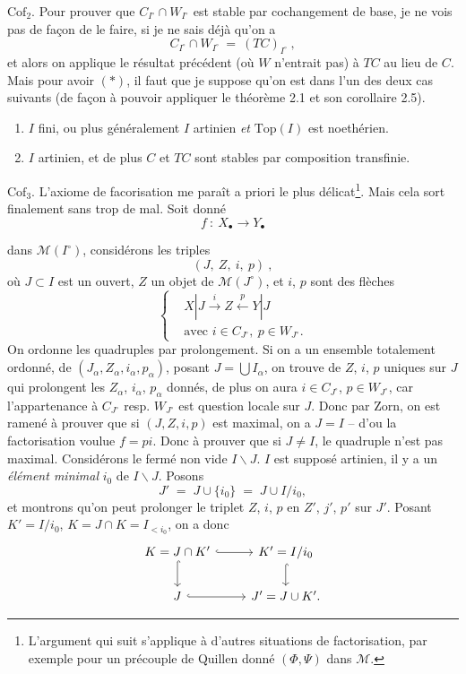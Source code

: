 \documentclass[11pt]{article}
\newcommand{\printedpage}[1]{\marginpar{\footnotesize p.~#1\ifstrequal{#1}{1}{\\[2pt]{[page 1]}}{}}}
\newcommand{\msp}[1]{\ifstrequal{#1}{page 1}{}{\marginpar{\footnotesize [#1]}}}
\newcommand{\M}{\mathcal{M}}
\begin{document}
$\mathrm{Cof}_2$. Pour prouver que $C_{I^\circ} \cap W_{I^\circ}$ est stable par cochangement de base, je ne vois pas de façon de le faire, si je ne sais déjà qu'on a
\[ C_{I^\circ} \cap W_{I^\circ} \ = \ (TC)_{I^\circ}\ , \tag*{$(*)$} \]
et alors on applique le résultat précédent (où $W$ n'entrait pas) à $TC$ au lieu de $C$. Mais pour avoir $(*)$, il faut que je suppose qu'on est dans l'un des deux cas suivants (de façon à pouvoir appliquer le théorème 2.1 et son corollaire 2.5).
\begin{enumerate}[leftmargin=2.5em]
\item[a)] $I$ fini, ou plus généralement $I$ artinien \textit{et} $\mathrm{Top}(I)$ est noethérien.
\item[b)] $I$ artinien, et de plus $C$ et $TC$ sont stables par composition transfinie.
\end{enumerate}
$\mathrm{Cof}_3$. L'axiome de facorisation me paraît a priori le plus délicat\footnote[15]{L'argument qui suit s'applique à d'autres situations de factorisation, par exemple pour un précouple de Quillen donné $(\Phi, \Psi)$ dans $\M$.}. Mais cela sort finalement sans trop de mal. Soit donné %
\[ f \ : \ X_\bullet \longrightarrow Y_\bullet \]

\printedpage{24}

\msp{45}dans $\mathcal{M}(I^\circ)$, considérons les triples
\[
(J,\ Z,\ i,\ p)\ ,
\]
où $J\subset I$ est un ouvert, $Z$ un objet de $\mathcal{M}(J^\circ)$, et $i$, $p$ sont des flèches
\[
\left\{
\begin{aligned}
& X|J \xrightarrow{\ i\ } Z \xleftarrow{\ p\ } Y|J \\
& \text{avec } i\in C_{J^\circ},\ p\in W_{J^\circ}.
\end{aligned}
\right.
\]
On ordonne les quadruples par prolongement. Si on a un ensemble totalement ordonné, de $(J_\alpha,Z_\alpha,i_\alpha,p_\alpha)$, posant $J=\bigcup I_\alpha$, on trouve de $Z$, $i$, $p$ uniques sur $J$ qui prolongent %
les $Z_\alpha$, $i_\alpha$, $p_\alpha$ donnés, de plus on aura $i\in C_{J^\circ}$, $p\in W_{J^\circ}$, car l'appartenance à $C_{J^\circ}$ resp. $W_{J^\circ}$ est question locale sur $J$. Donc par Zorn, on est ramené à prouver que si $(J,Z,i,p)$ est maximal, on a $J=I$ – d'ou la factorisation voulue $f=pi$. Donc à prouver que si %
$J\neq I$, le quadruple n'est pas maximal. Considérons le fermé non vide $I\backslash J$. $I$ est supposé artinien, il y a un \textit{élément minimal} $i_0$ de $I\backslash J$. Posons
\msp{46}
\[
J' \;=\; J\cup\{i_0\} \;=\; J\cup I/i_0,
\]
et montrons qu'on peut prolonger le triplet $Z$, $i$, $p$ en $Z'$, $j'$, $p'$ sur $J'$. Posant $K'=I/i_0$, %
$K=J\cap K=I_{<i_0}$, on a donc %
\[
\begin{tikzcd}
K=J\cap K' \arrow[r, hook] \arrow[d, hook] & K'=I/i_0 \arrow[d, hook] \\
J \arrow[r, hook] & J'=J\cup K'.
\end{tikzcd}
\]
\end{document}
